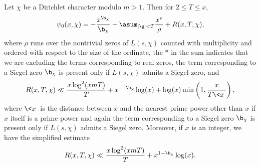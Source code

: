     \begin{corollary}\label{cor:explicit_formula_Dirichlet_corollary}
      Let \(\chi\) be a Dirichlet character modulo \(m > 1\). Then for \(2 \le T \le x\),
      \[
        \psi_{0}(x,\chi) = -\frac{x^{\b_{\chi}}}{\b_{\chi}}-\asum_{|\g| < T}\frac{x^{\rho}}{\rho}+R(x,T,\chi),
      \]
      where \(\rho\) runs over the nontrivial zeros of \(L(s,\chi)\) counted with multiplicity and ordered with respect to the size of the ordinate, the \(\ast\) in the sum indicates that we are excluding the terms corresponding to real zeros, the term corresponding to a Siegel zero \(\b_{\chi}\) is present only if \(L(s,\chi)\) admits a Siegel zero, and
      \[
        R(x,T,\chi) \ll \frac{x\log^{2}(xmT)}{T}+x^{1-\b_{\chi}}\log(x)+\log(x)\min\left(1,\frac{x}{T\<x\>}\right),
      \]
      where \(\<x\>\) is the distance between \(x\) and the nearest prime power other than \(x\) if \(x\) itself is a prime power and again the term corresponding to a Siegel zero \(\b_{\chi}\) is present only if \(L(s,\chi)\) admits a Siegel zero. Moreover, if \(x\) is an integer, we have the simplified estimate
      \[
        R(x,T,\chi) \ll \frac{x\log^{2}(xmT)}{T}+x^{1-\b_{\chi}}\log(x).
      \]
    \end{corollary}
